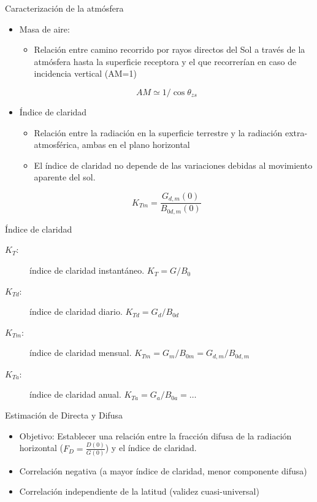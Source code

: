 \documentclass[xcolor={usenames,svgnames,dvipsnames}]{beamer}
\begin{document}
\begin{frame}[label={sec:org425f1f3}]{Caracterización de la atmósfera}
\begin{itemize}
\item \alert{Masa de aire}:

\begin{itemize}
\item Relación entre camino recorrido por rayos directos del Sol a
través de la atmósfera hasta la superficie receptora y el que recorrerían en caso de incidencia vertical (AM=1)
\end{itemize}

\[
     AM \simeq 1/\cos\theta_{zs}
   \]

\item \alert{Índice de claridad}

\begin{itemize}
\item Relación entre la radiación en la superficie terrestre y la
radiación extra-atmosférica, ambas en el plano horizontal

\item El índice de claridad \alert{no depende de las variaciones debidas al
movimiento aparente del sol}.
\end{itemize}

\[
     K_{Tm}=\frac{G_{d,m}(0)}{B_{0d,m}(0)}
   \]
\end{itemize}
\end{frame}

\begin{frame}[label={sec:org17acec9}]{Índice de claridad}
\begin{description}
\item[{\(K_{T}\):}] índice de claridad instantáneo. \(K_{T}=G/B_{0}\)

\item[{\(K_{Td}\):}] índice de claridad diario. \(K_{Td}=G_{d}/B_{0d}\)

\item[{\(K_{Tm}\):}] índice de claridad mensual. \(K_{Tm}=G_{m}/B_{0m}=G_{d,m}/B_{0d,m}\)

\item[{\(K_{Ta}\):}] índice de claridad anual. \(K_{Ta} = G_{a}/B_{0a} = \dots\)
\end{description}
\end{frame}

\begin{frame}[label={sec:org7c7a0bc}]{Estimación de Directa y Difusa}
\begin{itemize}
\item Objetivo: Establecer una \alert{relación entre la fracción difusa} de la radiación horizontal (\(F_{D}=\frac{D(0)}{G(0)}\)) y \alert{el índice de claridad}.

\item \alert{Correlación negativa} (a mayor índice de claridad, menor componente difusa)

\item \alert{Correlación independiente de la latitud} (validez cuasi-universal)
\end{itemize}
\end{frame}
\end{document}

